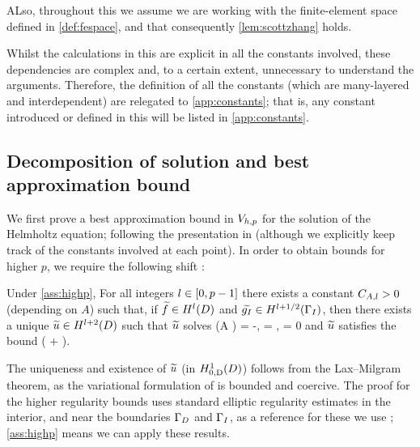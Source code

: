 ALso, throughout this  we assume we are working with the finite-element space defined in \cref{def:fespace}, and that consequently \cref{lem:scottzhang} holds.


Whilst the calculations in this  are explicit in all the constants involved, these dependencies are complex and, to a certain extent, unnecessary to understand the arguments. Therefore, the definition of all the constants (which are many-layered and interdependent) are relegated to \cref{app:constants}; that is, any constant introduced or defined in this  will be listed in \cref{app:constants}.

\subsection{Decomposition of solution and best approximation bound}

We first prove a best approximation bound in $V_{h,p}$ for the solution of the Helmholtz equation; following the presentation in \cite{ChNi:18a} (although we explicitly keep track of the constants involved at each point). In order to obtain bounds for higher $p$, we require the following shift :

\label{thm:shift}
Under \cref{ass:highp}, For all integers $l \in \mleft[0,p-1\mright]$ there exists a constant $C_{A,l}>0$ (depending on $A$) such that, if $\ftilde \in \HlD$ and $\gItilde \in \HlphGI$, then there exists a unique $\utilde \in \HlptD$ such that $\widetilde{u}$ solves
\beqs
\grad \cdot \mleft(A \grad \utilde\mright) = -\ftilde,
\eeqs
\beqs
\dn \utilde = \gItilde, \tand
\eeqs
\beqs
\trD \utilde = 0
\eeqs
and $\widetilde{u}$ satisfies the bound
\beq\label{eq:shift}
\NHlptD{\utilde} \leq \CAl \mleft(\NHlD{\ftilde} + \NHlphGI{\gItilde}\mright).
\eeq
\enth

The uniqueness and existence of $\widetilde{u}$ (in $\HozDD$) follows from the Lax--Milgram theorem, as the variational formulation of is bounded and coercive. The proof for the higher regularity bounds uses standard elliptic regularity estimates in the interior, and near the boundaries $\Gamma_{D}$ and $\Gamma_{I}$, as a reference for these we use \cite[pp. 137-138]{Mc:00}; \cref{ass:highp} means we can apply these results.

